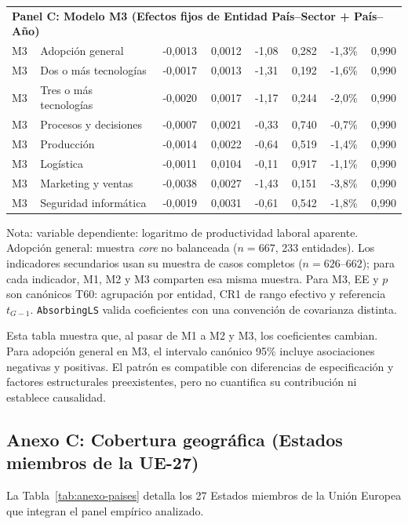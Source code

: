 \documentclass[12pt,a4paper]{article}
\begin{document}
\begin{table}[H]
\begin{tabularx}{\textwidth}{lXrrrrrr}
\midrule
\multicolumn{8}{l}{\textbf{Panel C: Modelo M3 (Efectos fijos de Entidad País--Sector + País--Año)}} \\
M3 & Adopción general & -0,0013 & 0,0012 & -1,08 & 0,282 & -1,3\% & 0,990 \\
M3 & Dos o más tecnologías & -0,0017 & 0,0013 & -1,31 & 0,192 & -1,6\% & 0,990 \\
M3 & Tres o más tecnologías & -0,0020 & 0,0017 & -1,17 & 0,244 & -2,0\% & 0,990 \\
M3 & Procesos y decisiones & -0,0007 & 0,0021 & -0,33 & 0,740 & -0,7\% & 0,990 \\
M3 & Producción & -0,0014 & 0,0022 & -0,64 & 0,519 & -1,4\% & 0,990 \\
M3 & Logística & -0,0011 & 0,0104 & -0,11 & 0,917 & -1,1\% & 0,990 \\
M3 & Marketing y ventas & -0,0038 & 0,0027 & -1,43 & 0,151 & -3,8\% & 0,990 \\
M3 & Seguridad informática & -0,0019 & 0,0031 & -0,61 & 0,542 & -1,8\% & 0,990 \\
\bottomrule
\end{tabularx}
\begin{flushleft}
\tiny Nota: variable dependiente: logaritmo de productividad laboral aparente. Adopción general: muestra \textit{core} no balanceada ($n=667$, 233 entidades). Los indicadores secundarios usan su muestra de casos completos ($n=626\text{--}662$); para cada indicador, M1, M2 y M3 comparten esa misma muestra. Para M3, EE y $p$ son canónicos T60: agrupación por entidad, CR1 de rango efectivo y referencia $t_{G-1}$. \texttt{AbsorbingLS} valida coeficientes con una convención de covarianza distinta.
\end{flushleft}
\end{table}

Esta tabla muestra que, al pasar de M1 a M2 y M3, los coeficientes cambian. Para adopción general en M3, el intervalo canónico 95\% incluye asociaciones negativas y positivas. El patrón es compatible con diferencias de especificación y factores estructurales preexistentes, pero no cuantifica su contribución ni establece causalidad.

\subsection*{Anexo C: Cobertura geográfica (Estados miembros de la UE-27)}

\label{anexo:paises}

La Tabla~\ref{tab:anexo-paises} detalla los 27 Estados miembros de la Unión Europea que integran el panel empírico analizado.
\end{document}
